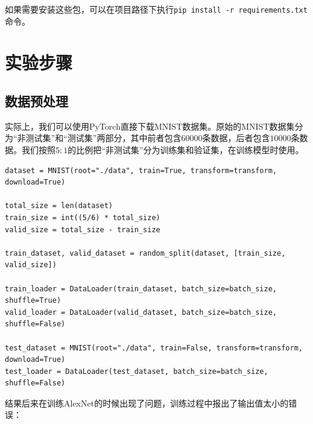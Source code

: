 \documentclass{article}
\begin{document}
如果需要安装这些包，可以在项目路径下执行\lstinline|pip install -r requirements.txt|命令。
\section{实验步骤}
\subsection{数据预处理}
实际上，我们可以使用PyTorch直接下载MNIST数据集。原始的MNIST数据集分为“非测试集”和“测试集”两部分，其中前者包含$60000$条数据，后者包含$10000$条数据。我们按照$5:1$的比例把“非测试集”分为训练集和验证集，在训练模型时使用。
\begin{lstlisting}
dataset = MNIST(root="./data", train=True, transform=transform, download=True)

total_size = len(dataset)
train_size = int((5/6) * total_size) 
valid_size = total_size - train_size 
    
train_dataset, valid_dataset = random_split(dataset, [train_size, valid_size])

train_loader = DataLoader(train_dataset, batch_size=batch_size, shuffle=True)
valid_loader = DataLoader(valid_dataset, batch_size=batch_size, shuffle=False)

test_dataset = MNIST(root="./data", train=False, transform=transform, download=True)
test_loader = DataLoader(test_dataset, batch_size=batch_size, shuffle=False)
\end{lstlisting}
结果后来在训练AlexNet的时候出现了问题，训练过程中报出了输出值太小的错误：
\end{document}

